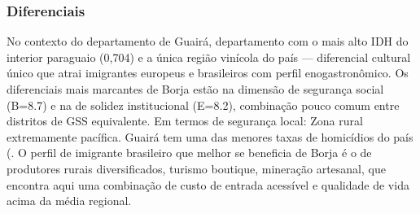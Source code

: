 \subsubsection*{Diferenciais}\label{dif-borja-0402}
No contexto do departamento de Guairá, departamento com o mais alto IDH do interior paraguaio (0,704) e a única região vinícola do país — diferencial cultural único que atrai imigrantes europeus e brasileiros com perfil enogastronômico. Os diferenciais mais marcantes de Borja estão na dimensão de segurança social (B=8.7) e na de solidez institucional (E=8.2), combinação pouco comum entre distritos de GSS equivalente. Em termos de segurança local: Zona rural extremamente pacífica. Guairá tem uma das menores taxas de homicídios do país (. O perfil de imigrante brasileiro que melhor se beneficia de Borja é o de produtores rurais diversificados, turismo boutique, mineração artesanal, que encontra aqui uma combinação de custo de entrada acessível e qualidade de vida acima da média regional.
